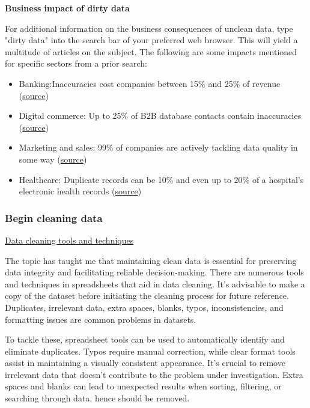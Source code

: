 \documentclass[]{article}
\begin{document}
\textbf{Business impact of dirty data}

For additional information on the business consequences of unclean data, type "dirty data" into the search bar of your preferred web browser. This will yield a multitude of articles on the subject. The following are some impacts mentioned for specific sectors from a prior search:

\begin{itemize}
  \item Banking:Inaccuracies cost companies between 15\% and 25\% of revenue (\href{https://sloanreview.mit.edu/article/seizing-opportunity-in-data-quality/}{source})
  \item Digital commerce: Up to 25\% of B2B database contacts contain inaccuracies (\href{https://www.demandgen.com/dirty-data-what-is-it-costing-you/}{source})
  \item Marketing and sales: 99\% of companies are actively tackling data quality in some way (\href{https://www.dqglobal.com/blog/why-bad-data-is-wasting-your-marketing-efforts/}{source})
  \item Healthcare: Duplicate records can be 10\% and even up to 20\% of a hospital’s electronic health records (\href{https://searchhealthit.techtarget.com/feature/Hospitals-battle-duplicate-medical-records-with-technology}{source})
\end{itemize}

\subsubsection{Begin cleaning data}
\uline{Data cleaning tools and techniques}

The topic has taught me that maintaining clean data is essential for preserving data integrity and facilitating reliable decision-making. There are numerous tools and techniques in spreadsheets that aid in data cleaning. It's advisable to make a copy of the dataset before initiating the cleaning process for future reference. Duplicates, irrelevant data, extra spaces, blanks, typos, inconsistencies, and formatting issues are common problems in datasets.

To tackle these, spreadsheet tools can be used to automatically identify and eliminate duplicates. Typos require manual correction, while clear format tools assist in maintaining a visually consistent appearance. It's crucial to remove irrelevant data that doesn't contribute to the problem under investigation. Extra spaces and blanks can lead to unexpected results when sorting, filtering, or searching through data, hence should be removed.
\end{document}
